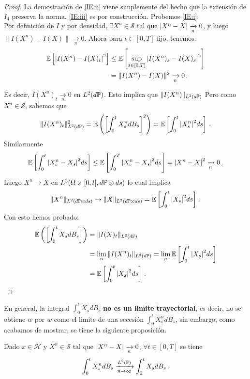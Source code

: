 \begin{proof}
\gris
La demostración de \ref{IE:ii} viene simplemente del hecho que la extensión de $I_4$ preserva la norma. \ref{IE:iii} es por construcción. Probemos \ref{IE:i}: 
\\ Por definición de $I$ y por densidad, $\exists X^n \in \mathcal{S}$ tal que $\abs{X^{n} - X} 
\xrightarrow[n]{} 0$, y luego $\|I(X^n) - I(X)\| \xrightarrow[n]{} 0$. Ahora para  $t \in [0,T]$ fijo, tenemos: 
\begin{align*}
    \E \left[ \abs{I(X^{n}) - I(X)_t}^2 \right] & \le \E \left[ \sup_{s \in [0,T]} \abs{I(X^n)_s - I(X)_s}^2 \right]\\ 
    &= \|I(X^n) - I(X) \|^2 \xrightarrow[n]{} 0 \,.
\end{align*}

Es decir, $I(X^n)_t \xrightarrow[n]{} 0$ en $L^2(d\P)$. Esto implica que $\|I(X^{n})\|_{L^2(d\P)}$ 
Pero como $X^n \in \mathcal{S}$, sabemos que 
\begin{equation*}
    \|I(X^n)_t\|^2_{L^2(d\P)} = \E \left( \left[\int_{0}^t X_s^n dB_s \right]^2 \right)
    = \E \left[ \int_{0}^t \abs{X_s^n}^2 ds \right]\,.
\end{equation*}
Similarmente 
\begin{equation*}
    \E \left[ \int_{0}^{t} \abs{X_s^n - X_s}^2 ds \right] \le \E \left[ \int_{0}^{T} \abs{X_s^n - X_s}^2 ds \right] = \abs{X^n - X}^2 \xrightarrow[n]{} 0 \,.
\end{equation*}
Luego $X^n \to X$ en $L^2(\Omega \times [0,t], d\P \otimes ds)$ lo cual implica 
\begin{equation*}
        \|X^n\|_{L^2(d\P \otimes ds)} \to \|X\|_{L^2(d\P \otimes ds)} 
        = \E \left[ \int_{0}^t \abs{X_s}^2 ds \right]\,.
\end{equation*}
Con esto hemos probado:
\begin{align*}
    \E \left( \left[ \int_{0}^{t} X_s dB_s \right] \right) 
    &= \|I(X)_{t}\|_{L^2(d\P)} \\
    &= \lim_{n} \|I(X^n)_t\|_{L^2(d\P)} = \lim_{n} \E \left[\int_{0}^{t} \abs{X_s}^2 ds \right] \\
    &= \E \left[\int_{0}^{t} \abs{X_s}^2 ds \right]\,.
\end{align*}
\findem
\negro
\end{proof}

\begin{remark}
    En general, la integral $\int_{0}^{t}X_s dB_s$ \textbf{no es un limite trayectorial}, es decir, no se obtiene $w$ por $w$ como el limite de una secesión $\int_{0}^{t} X_s^n dB_s$, sin embargo, como acabamos de mostrar, se tiene la siguiente proposición.
\end{remark}
\begin{proposition}
    Dado $x \in \mathcal{H}$ y $X^n \in \mathcal{S}$ tal que $\abs{X^n - X} \xrightarrow[n]{} 0$, $\forall t \in [0,T]$ se tiene 
    \begin{equation*}
        \int_{0}^{t} X_s^n dB_s \xrightarrow[n \to \infty]{L^2(\P)} \int_{0}^{t}X_s dB_s\,.
    \end{equation*}
\end{proposition}

